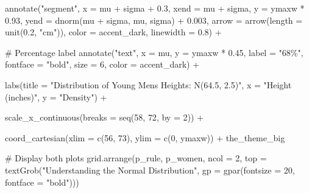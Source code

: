 \documentclass[
  letterpaper,
  DIV=11,
  numbers=noendperiod]{scrreprt}
\newenvironment{Shaded}{\begin{snugshade}}{\end{snugshade}}
\newcommand{\AttributeTok}[1]{\textcolor[rgb]{0.40,0.45,0.13}{#1}}
\newcommand{\CommentTok}[1]{\textcolor[rgb]{0.37,0.37,0.37}{#1}}
\newcommand{\DecValTok}[1]{\textcolor[rgb]{0.68,0.00,0.00}{#1}}
\newcommand{\FloatTok}[1]{\textcolor[rgb]{0.68,0.00,0.00}{#1}}
\newcommand{\FunctionTok}[1]{\textcolor[rgb]{0.28,0.35,0.67}{#1}}
\newcommand{\NormalTok}[1]{\textcolor[rgb]{0.00,0.23,0.31}{#1}}
\newcommand{\SpecialCharTok}[1]{\textcolor[rgb]{0.37,0.37,0.37}{#1}}
\newcommand{\StringTok}[1]{\textcolor[rgb]{0.13,0.47,0.30}{#1}}
\begin{document}
\begin{Shaded}
\begin{Highlighting}[]
  \FunctionTok{annotate}\NormalTok{(}\StringTok{"segment"}\NormalTok{, }\AttributeTok{x =}\NormalTok{ mu }\SpecialCharTok{+}\NormalTok{ sigma }\SpecialCharTok{+} \FloatTok{0.3}\NormalTok{, }\AttributeTok{xend =}\NormalTok{ mu }\SpecialCharTok{+}\NormalTok{ sigma, }
           \AttributeTok{y =}\NormalTok{ ymaxw }\SpecialCharTok{*} \FloatTok{0.93}\NormalTok{, }\AttributeTok{yend =} \FunctionTok{dnorm}\NormalTok{(mu }\SpecialCharTok{+}\NormalTok{ sigma, mu, sigma) }\SpecialCharTok{+} \FloatTok{0.003}\NormalTok{,}
           \AttributeTok{arrow =} \FunctionTok{arrow}\NormalTok{(}\AttributeTok{length =} \FunctionTok{unit}\NormalTok{(}\FloatTok{0.2}\NormalTok{, }\StringTok{"cm"}\NormalTok{)), }
           \AttributeTok{color =}\NormalTok{ accent\_dark, }\AttributeTok{linewidth =} \FloatTok{0.8}\NormalTok{) }\SpecialCharTok{+}
  
  \CommentTok{\# Percentage label}
  \FunctionTok{annotate}\NormalTok{(}\StringTok{"text"}\NormalTok{, }\AttributeTok{x =}\NormalTok{ mu, }\AttributeTok{y =}\NormalTok{ ymaxw }\SpecialCharTok{*} \FloatTok{0.45}\NormalTok{, }
           \AttributeTok{label =} \StringTok{"68\%"}\NormalTok{, }\AttributeTok{fontface =} \StringTok{"bold"}\NormalTok{, }\AttributeTok{size =} \DecValTok{6}\NormalTok{, }\AttributeTok{color =}\NormalTok{ accent\_dark) }\SpecialCharTok{+}
  
  \FunctionTok{labs}\NormalTok{(}\AttributeTok{title =} \StringTok{"Distribution of Young Men\textquotesingle{}s Heights: N(64.5, 2.5)"}\NormalTok{, }
       \AttributeTok{x =} \StringTok{"Height (inches)"}\NormalTok{, }
       \AttributeTok{y =} \StringTok{"Density"}\NormalTok{) }\SpecialCharTok{+}
  
  \FunctionTok{scale\_x\_continuous}\NormalTok{(}\AttributeTok{breaks =} \FunctionTok{seq}\NormalTok{(}\DecValTok{58}\NormalTok{, }\DecValTok{72}\NormalTok{, }\AttributeTok{by =} \DecValTok{2}\NormalTok{)) }\SpecialCharTok{+}
  
  \FunctionTok{coord\_cartesian}\NormalTok{(}\AttributeTok{xlim =} \FunctionTok{c}\NormalTok{(}\DecValTok{56}\NormalTok{, }\DecValTok{73}\NormalTok{), }\AttributeTok{ylim =} \FunctionTok{c}\NormalTok{(}\DecValTok{0}\NormalTok{, ymaxw)) }\SpecialCharTok{+}
\NormalTok{  the\_theme\_big}

\CommentTok{\# Display both plots}
\FunctionTok{grid.arrange}\NormalTok{(p\_rule, p\_women, }\AttributeTok{ncol =} \DecValTok{2}\NormalTok{,}
             \AttributeTok{top =} \FunctionTok{textGrob}\NormalTok{(}\StringTok{"Understanding the Normal Distribution"}\NormalTok{,}
                           \AttributeTok{gp =} \FunctionTok{gpar}\NormalTok{(}\AttributeTok{fontsize =} \DecValTok{20}\NormalTok{, }\AttributeTok{fontface =} \StringTok{"bold"}\NormalTok{)))}
\end{Highlighting}
\end{Shaded}
\end{document}
